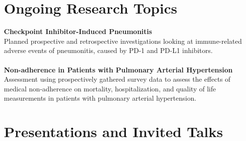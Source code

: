 \documentclass{book}
\begin{document}
%
%
%
%
%
  \section*{Ongoing Research Topics}
  \textbf{Checkpoint Inhibitor-Induced Pneumonitis}
  \\
  Planned prospective and retrospective investigations looking at immune-related adverse events of pneumonitis, caused by PD-1 and PD-L1 inhibitors.
	\\ \\
  \textbf{Non-adherence in Patients with Pulmonary Arterial Hypertension}
  \\
	Assessment using prospectively gathered survey data to assess the effects of medical non-adherence on mortality, hospitalization, and quality of life measurements in patients with pulmonary arterial hypertension.
  \section*{Presentations and Invited Talks}
 
\end{document}
